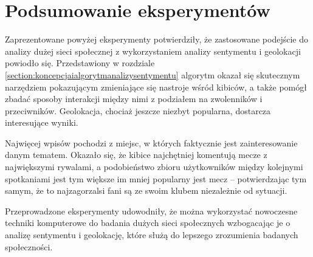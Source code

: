 \section{Podsumowanie eksperymentów}
Zaprezentowane powyżej eksperymenty potwierdziły, że zastosowane podejście do
analizy dużej sieci społecznej z wykorzystaniem analizy sentymentu i geolokacji
powiodło się. Przedstawiony w rozdziale
\ref{section:koncepcjaialgorytmanalizysentymentu} algorytm okazał się skutecznym
narzędziem pokazującym zmieniające się nastroje wśród kibiców, a także pomógł
zbadać sposoby interakcji między nimi z podziałem na zwolenników i przeciwników.
Geolokacja, chociaż jeszcze niezbyt popularna, dostarcza interesujące wyniki.

Najwięcej wpisów pochodzi z miejsc, w których faktycznie jest zainteresowanie
danym tematem. Okazało się, że kibice najchętniej komentują mecze z
największymi rywalami, a podobieństwo zbioru użytkowników między kolejnymi
spotkaniami jest tym większe im mniej popularny jest mecz -- potwierdzając tym
samym, że to najzagorzalsi fani są ze swoim klubem niezależnie od sytuacji.

Przeprowadzone eksperymenty udowodniły, że można wykorzystać nowoczesne techniki
komputerowe do badania dużych sieci społecznych wzbogacając je o analizę
sentymentu i geolokację, które służą do lepszego zrozumienia badanych
społeczności.


